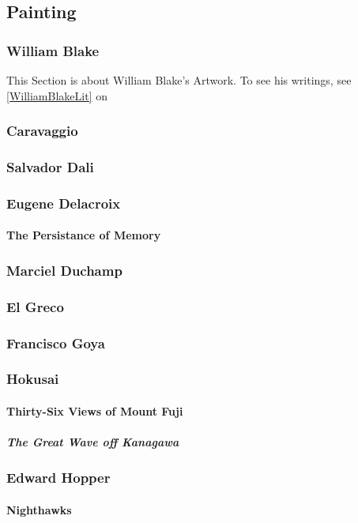 		\subsection{Painting}
			\subsubsection{William Blake}
				\label{WilliamBlakeArt} This Section is about William Blake's Artwork.  To see his writings, see \ref{WilliamBlakeLit} on 
			\subsubsection{Caravaggio}
			\subsubsection{Salvador Dali}
			\subsubsection{Eugene Delacroix}
				\paragraph{The Persistance of Memory} 
			\subsubsection{Marciel Duchamp}
			\subsubsection{El Greco}
			\subsubsection{Francisco Goya}
			\subsubsection{Hokusai}
				\paragraph{Thirty-Six Views of Mount Fuji}
					\subparagraph{The Great Wave off Kanagawa}
			\subsubsection{Edward Hopper}
				\paragraph{Nighthawks}
